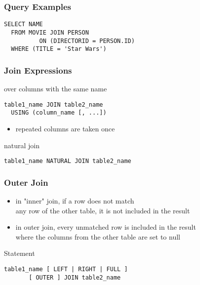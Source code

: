 \documentclass[dvipsnames]{beamer}
\theoremstyle{plain}
\begin{document}
\begin{frame}[fragile]
  \frametitle{Query Examples}

  \begin{example}
    \begin{lstlisting}
SELECT NAME
  FROM MOVIE JOIN PERSON
          ON (DIRECTORID = PERSON.ID)
  WHERE (TITLE = 'Star Wars')
    \end{lstlisting}
  \end{example}
\end{frame}

\begin{frame}[fragile]
  \frametitle{Join Expressions}

  \begin{block}{over columns with the same name}
    \begin{lstlisting}
table1_name JOIN table2_name
  USING (column_name [, ...])
    \end{lstlisting}
  \end{block}

  \begin{itemize}
    \item repeated columns are taken once
  \end{itemize}

  \pause
  \begin{block}{natural join}
    \begin{lstlisting}
table1_name NATURAL JOIN table2_name
    \end{lstlisting}
  \end{block}
\end{frame}

\begin{frame}[fragile]
  \frametitle{Outer Join}

  \begin{itemize}
    \item in "inner" join, if a row does not match\\
      any row of the other table, it is not included in the result

    \item in outer join, every unmatched row is included in the result\\
      where the columns from the other table are set to null
  \end{itemize}

  \pause
  \begin{block}{Statement}
    \begin{lstlisting}
table1_name [ LEFT | RIGHT | FULL ]
       [ OUTER ] JOIN table2_name
    \end{lstlisting}
  \end{block}
\end{frame}
\end{document}
